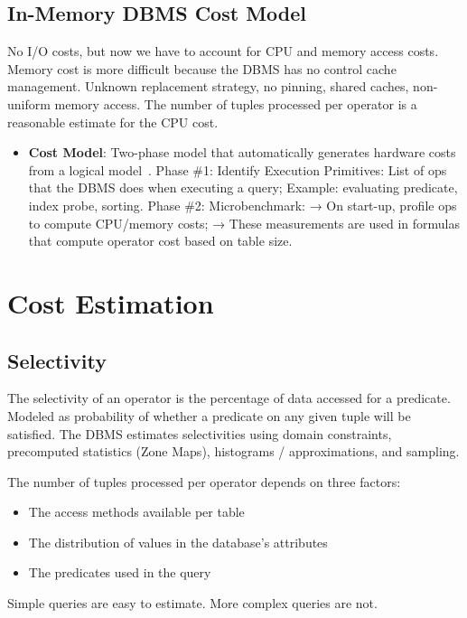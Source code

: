 \documentclass[11pt]{article}
\begin{document}
\subsection*{In-Memory DBMS Cost Model}
No I/O costs, but now we have to account for CPU and memory access costs. Memory cost is more difficult because the DBMS has no control cache management. Unknown replacement strategy, no pinning, shared caches, non-uniform memory access. The number of tuples processed per operator is a reasonable estimate for the CPU cost.

\begin{itemize}
	\item \textbf{ Cost Model}:
	Two-phase model that automatically generates hardware costs from a logical model~\cite{Listgarten1996}.
	Phase \#1: Identify Execution Primitives:
	List of ops that the DBMS does when executing a query;
	Example: evaluating predicate, index probe, sorting.
	Phase \#2: Microbenchmark:
	→ On start-up, profile ops to compute CPU/memory costs;
	→ These measurements are used in formulas that compute
	operator cost based on table size.
\end{itemize}

\section{Cost Estimation}
\subsection*{Selectivity}
The selectivity of an operator is the percentage of data accessed for a predicate. Modeled as probability of whether a predicate on any given tuple will be satisfied. The DBMS estimates selectivities using domain constraints, precomputed statistics (Zone Maps), histograms / approximations, and sampling.

The number of tuples processed per operator depends on three factors:
\begin{itemize}
	\item The access methods available per table
	\item The distribution of values in the database’s attributes
	\item The predicates used in the query
\end{itemize} 
Simple queries are easy to estimate. More complex queries are not.
\end{document}
